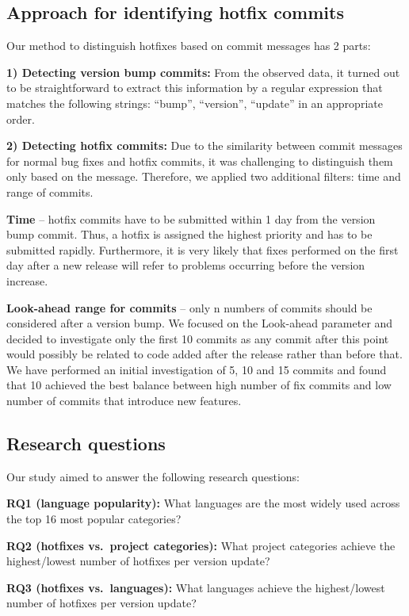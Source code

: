 \documentclass{sig-alternate}
\begin{document}
\subsection{Approach for identifying hotfix commits}
Our method to distinguish hotfixes based on commit messages has 2 parts:

\textbf{1) Detecting version bump commits:} From the observed data, it turned out to be straightforward to extract this information by a regular expression that matches the following strings: ``bump'', ``version'', ``update'' in an appropriate order.

\textbf{2) Detecting hotfix commits:} Due to the similarity between commit messages for normal bug fixes and hotfix commits, it was challenging to distinguish them only based on the message. Therefore, we applied two additional filters: time and range of commits.

\textbf{Time} -- hotfix commits have to be submitted within 1 day from the version bump commit. Thus, a hotfix is assigned the highest priority and has to be submitted rapidly. Furthermore, it is very likely that fixes performed on the first day after a new release will refer to problems occurring before the version increase.

\textbf{Look-ahead range for commits} -- only n numbers of commits should be considered after a version bump. We focused on the Look-ahead parameter and decided to investigate only the first 10 commits as any commit after this point would possibly be related to code added after the release rather than before that. We have performed an initial investigation of 5, 10 and 15 commits and found that 10 achieved the best balance between high number of fix commits and low number of commits that introduce new features.

\subsection{Research questions}
\noindent Our study aimed to answer the following research questions:

\noindent\textbf{RQ1 (language popularity):} What languages are the most widely used across the top 16 most popular categories?

\noindent\textbf{RQ2 (hotfixes vs.\ project categories):} What project categories achieve the highest/lowest number of hotfixes per version update?

\noindent\textbf{RQ3 (hotfixes vs.\ languages):} What languages achieve the highest/lowest number of hotfixes per version update?
\end{document}
